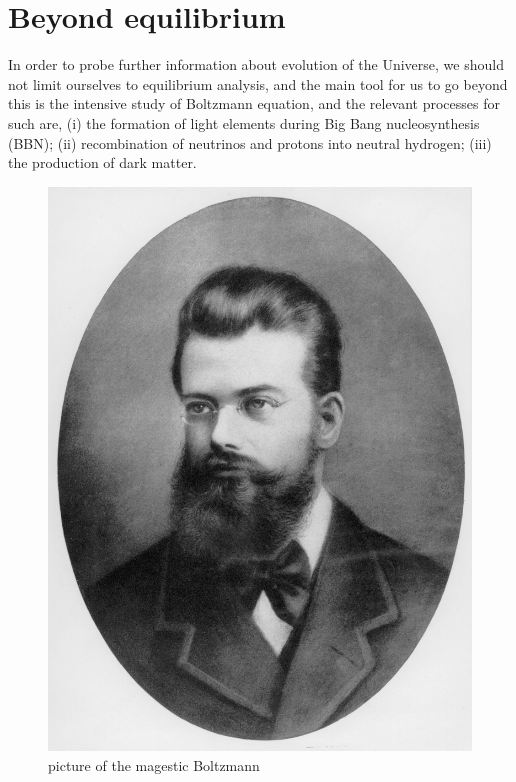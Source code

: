 \documentclass[a4paper, 12pt]{article}
\begin{document}
{{\section{Beyond equilibrium}

  In order to probe further information about evolution of the Universe,
  we should not limit ourselves to equilibrium analysis, and the main tool
  for us to go beyond this is the intensive study of Boltzmann equation,
  and the relevant processes for such are, (i) the formation of light elements
  during Big Bang nucleosynthesis (BBN); (ii) recombination of neutrinos
  and protons into neutral hydrogen; (iii) the production of dark
  matter.

  \begin{figure}[h!]
  \begin{center}
    \includegraphics[scale=0.1]{Figures/boltzmann.jpeg}
  \end{center}
  \caption{picture of the magestic Boltzmann}
  \label{fig:boltzmann papa}
  \end{figure}
  

}}
\end{document}
